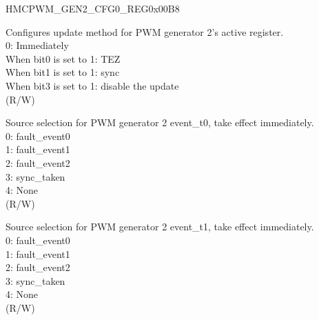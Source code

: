 \begin{register}{H}{MCPWM\_GEN2\_CFG0\_REG}{0x00B8}\label{regdesc:MCPWMGEN2CFG0REG}
%
%
%
%
\regnewline%
\begin{regdesc}\begin{reglist}
\label{fielddesc:MCPWMGEN2CFGUPMETHOD}\item [MCPWM\_GEN2\_CFG\_UPMETHOD] Configures update method for PWM generator 2's active register.
\\0: Immediately
\\When bit0 is set to 1: TEZ
\\When bit1 is set to 1: sync
\\When bit3 is set to 1: disable the update
\\(R/W)
\label{fielddesc:MCPWMGEN2T0SEL}\item [MCPWM\_GEN2\_T0\_SEL] Source selection for PWM generator 2 event\_t0, take effect immediately. \\
0: fault\_event0 \\
1: fault\_event1 \\
2: fault\_event2 \\
3: sync\_taken \\
4: None \\
(R/W)
\label{fielddesc:MCPWMGEN2T1SEL}\item [MCPWM\_GEN2\_T1\_SEL] Source selection for PWM generator 2 event\_t1, take effect immediately. \\
0: fault\_event0 \\
1: fault\_event1 \\
2: fault\_event2 \\
3: sync\_taken \\
4: None \\
(R/W)
\end{reglist}\end{regdesc}
\end{register}


